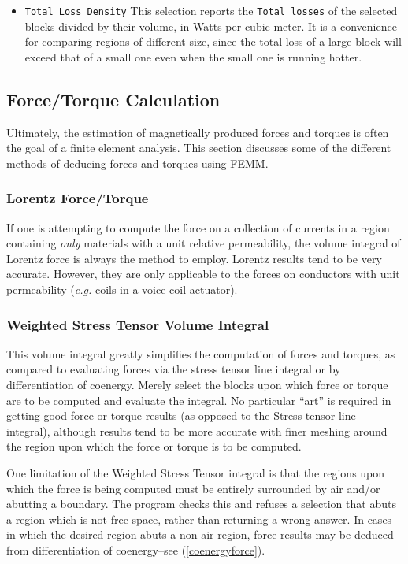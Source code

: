 \documentclass[12pt]{report}
\begin{document}
\begin{itemize}
\item {\tt Total Loss Density}  This selection reports the {\tt Total
losses} of the selected blocks divided by their volume, in Watts per cubic
meter.  It is a convenience for comparing regions of different size, since
the total loss of a large block will exceed that of a small one even when
the small one is running hotter.

\end{itemize}

\subsection{Force/Torque Calculation} \label{maxforce}

Ultimately, the estimation of magnetically produced forces and
torques is often the goal of a finite element analysis.  This
section discusses some of the different methods of deducing forces
and torques using FEMM.

\subsubsection{Lorentz Force/Torque}
If one is attempting to compute the force on a collection of
currents in a region containing {\em only} materials with a unit
relative permeability, the volume integral of Lorentz force is
always the method to employ.  Lorentz results tend to be
very accurate.  However, they are only applicable to the
forces on conductors with unit permeability ({\em e.g.} coils
in a voice coil actuator).

\subsubsection{Weighted Stress Tensor Volume Integral}
This volume integral greatly simplifies the computation of forces
and torques, as compared to evaluating forces via the stress tensor
line integral or by differentiation of coenergy. Merely select the
blocks upon which force or torque are to be computed and evaluate
the integral. No particular ``art'' is required in getting good
force or torque results (as opposed to the Stress tensor line
integral), although results tend to be more accurate with finer
meshing around the region upon which the force or torque is to be
computed.

One limitation of the Weighted Stress Tensor integral is that the
regions upon which the force is being computed must be entirely
surrounded by air and/or abutting a boundary.  The program checks this
and refuses a selection that abuts a region which is not free space,
rather than returning a wrong answer.  In cases in which the
desired region abuts a non-air region, force results may be deduced
from differentiation of coenergy--see (\ref{coenergyforce}).
\end{document}
